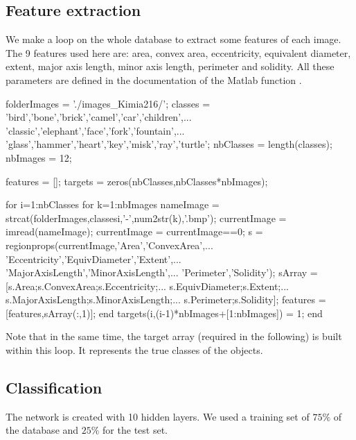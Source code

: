 \def\QRCODE{TB_image_TUT.IMG.machine_learning_matlabqrcode.png}
\def\QRPAGE{http://www.iptutorials.science/tree/master/TB_image/TUT.IMG.machine_learning/matlab}

\subsection{Feature extraction}
We make a loop on the whole database to extract some features of each image. The 9 features used here are: area, convex area, eccentricity, equivalent diameter, extent, major axis length, minor axis length, perimeter and solidity. All these parameters are defined in the documentation of the Matlab function .

\begin{matlab}
folderImages = './images_Kimia216/';
classes = {'bird','bone','brick','camel','car','children',...
    'classic','elephant','face','fork','fountain',...
    'glass','hammer','heart','key','misk','ray','turtle'};
nbClasses = length(classes);
nbImages = 12;

features = [];
targets = zeros(nbClasses,nbClasses*nbImages);

for i=1:nbClasses
    for k=1:nbImages
        nameImage = strcat(folderImages,classes{i},'-',num2str(k),'.bmp');
        currentImage = imread(nameImage);
        currentImage = currentImage==0;
        s  = regionprops(currentImage,'Area','ConvexArea',...
            'Eccentricity','EquivDiameter','Extent',...
            'MajorAxisLength','MinorAxisLength',...
            'Perimeter','Solidity');
        sArray = [s.Area;s.ConvexArea;s.Eccentricity;...
            s.EquivDiameter;s.Extent;...
            s.MajorAxisLength;s.MinorAxisLength;...
            s.Perimeter;s.Solidity];
        features = [features,sArray(:,1)];       
    end
    targets(i,(i-1)*nbImages+[1:nbImages]) = 1;
end
\end{matlab}

Note that in the same time, the target array (required in the following) is built within this loop. It represents the true classes of the objects.

\subsection{Classification}
The network is created with 10 hidden layers. We used a training set of $75\%$ of the database and $25\%$ for the test set.


